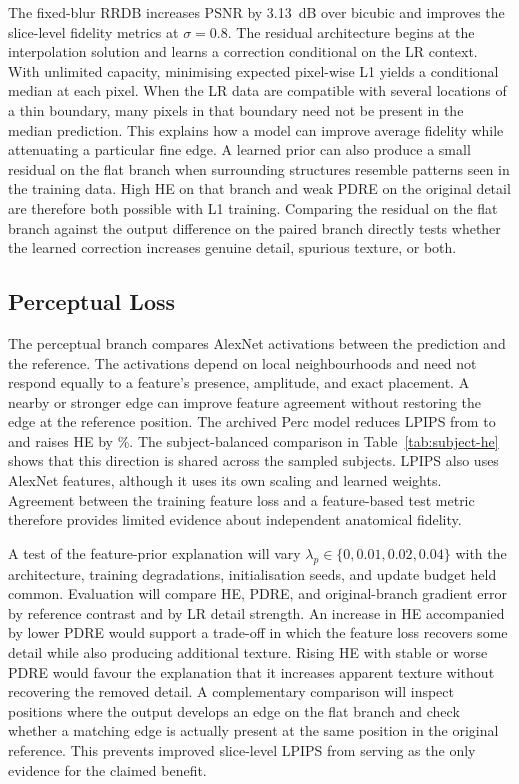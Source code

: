 \documentclass[journal]{IEEEtran}
\begin{document}
The fixed-blur RRDB increases PSNR by 3.13~dB over bicubic and improves the slice-level fidelity metrics at $\sigma=0.8$. The residual architecture begins at the interpolation solution and learns a correction conditional on the LR context. With unlimited capacity, minimising expected pixel-wise L1 yields a conditional median at each pixel. When the LR data are compatible with several locations of a thin boundary, many pixels in that boundary need not be present in the median prediction. This explains how a model can improve average fidelity while attenuating a particular fine edge. A learned prior can also produce a small residual on the flat branch when surrounding structures resemble patterns seen in the training data. High HE on that branch and weak PDRE on the original detail are therefore both possible with L1 training. Comparing the residual on the flat branch against the output difference on the paired branch directly tests whether the learned correction increases genuine detail, spurious texture, or both.

\subsection{Perceptual Loss}
The perceptual branch compares AlexNet activations between the prediction and the reference. The activations depend on local neighbourhoods and need not respond equally to a feature's presence, amplitude, and exact placement. A nearby or stronger edge can improve feature agreement without restoring the edge at the reference position. The archived Perc model reduces LPIPS from \LPIPSrrdb{} to \LPIPSperc{} and raises HE by \HEpercPct{}\%. The subject-balanced comparison in Table~\ref{tab:subject-he} shows that this direction is shared across the sampled subjects. LPIPS also uses AlexNet features, although it uses its own scaling and learned weights. Agreement between the training feature loss and a feature-based test metric therefore provides limited evidence about independent anatomical fidelity.

A test of the feature-prior explanation will vary $\lambda_p\in\{0,0.01,0.02,0.04\}$ with the architecture, training degradations, initialisation seeds, and update budget held common. Evaluation will compare HE, PDRE, and original-branch gradient error by reference contrast and by LR detail strength. An increase in HE accompanied by lower PDRE would support a trade-off in which the feature loss recovers some detail while also producing additional texture. Rising HE with stable or worse PDRE would favour the explanation that it increases apparent texture without recovering the removed detail. A complementary comparison will inspect positions where the output develops an edge on the flat branch and check whether a matching edge is actually present at the same position in the original reference. This prevents improved slice-level LPIPS from serving as the only evidence for the claimed benefit.
\end{document}
